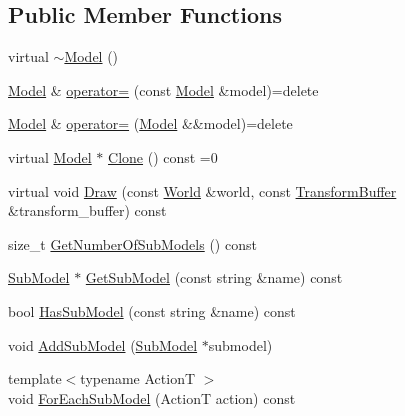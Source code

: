 \subsection*{Public Member Functions}
\begin{DoxyCompactItemize}
\item 
virtual \hyperlink{classmage_1_1_model_af9f45ed2dcf470f85bbfd144ca9857a7}{$\sim$\+Model} ()
\item 
\hyperlink{classmage_1_1_model}{Model} \& \hyperlink{classmage_1_1_model_a563515c64ec39cfcda9f6ca37576391b}{operator=} (const \hyperlink{classmage_1_1_model}{Model} \&model)=delete
\item 
\hyperlink{classmage_1_1_model}{Model} \& \hyperlink{classmage_1_1_model_a084e30d15822bfefa79128f30a57cc02}{operator=} (\hyperlink{classmage_1_1_model}{Model} \&\&model)=delete
\item 
virtual \hyperlink{classmage_1_1_model}{Model} $\ast$ \hyperlink{classmage_1_1_model_ae5e9bee52da0db8c7a29920c13ed40ea}{Clone} () const =0
\item 
virtual void \hyperlink{classmage_1_1_model_a2af6c0c8c05a675315ec5ad4b3763245}{Draw} (const \hyperlink{classmage_1_1_world}{World} \&world, const \hyperlink{structmage_1_1_transform_buffer}{Transform\+Buffer} \&transform\+\_\+buffer) const
\item 
size\+\_\+t \hyperlink{classmage_1_1_model_a29ad2496b11ef5af5f179cfe52943cd3}{Get\+Number\+Of\+Sub\+Models} () const
\item 
\hyperlink{classmage_1_1_sub_model}{Sub\+Model} $\ast$ \hyperlink{classmage_1_1_model_a1cae9eb62a353445d14b5331e88bdeac}{Get\+Sub\+Model} (const string \&name) const
\item 
bool \hyperlink{classmage_1_1_model_a319fb9b9d9c673ed9c83325d5bcbdfd7}{Has\+Sub\+Model} (const string \&name) const
\item 
void \hyperlink{classmage_1_1_model_abf3f207329b5d4482e515e206e856295}{Add\+Sub\+Model} (\hyperlink{classmage_1_1_sub_model}{Sub\+Model} $\ast$submodel)
\item 
{\footnotesize template$<$typename ActionT $>$ }\\void \hyperlink{classmage_1_1_model_ab50233128bb52002a11f3195b846c830}{For\+Each\+Sub\+Model} (ActionT action) const
\end{DoxyCompactItemize}
